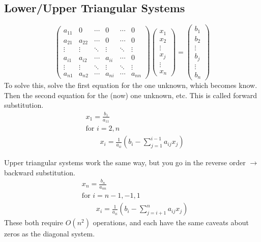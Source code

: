 \documentclass[12pt]{exam}
\begin{document}
\subsection*{Lower/Upper Triangular Systems}
\begin{equation}
   \begin{pmatrix}
      a_{11} & 0      & \cdots & 0      & \cdots & 0 \\
      a_{21} & a_{22} & \cdots & 0      & \cdots & 0 \\
      \vdots & \vdots & \ddots & \vdots & \ddots & \vdots \\     
      a_{i1} & a_{i2} & \cdots & a_{ii} & \cdots & 0 \\
      \vdots & \vdots & \ddots & \vdots & \ddots & \vdots \\
      a_{n1} & a_{n2} & \cdots & a_{ni} & \cdots & a_{nn} 
    \end{pmatrix} 
    \begin{pmatrix} x_1 \\ x_2 \\ \vdots \\ x_j \\ \vdots \\ x_n \end{pmatrix} =
    \begin{pmatrix} b_1 \\ b_2 \\ \vdots \\ b_j \\ \vdots \\ b_n \end{pmatrix}
    \nonumber   
\end{equation} 
%
To solve this, solve the first equation for the one unknown, which becomes know. Then the second equation for the (now) one unknown, etc. This is called forward substitution.
%
\ifprintanswers
\begin{align}
&x_1 = \frac{b_1}{a_{11}} \nonumber \\
&\text{for } i = 2, n \nonumber \\
&\qquad x_i = \frac{1}{a_{ii}}(b_i - \sum_{j=1}^{i-1} a_{ij} x_j) \nonumber
\end{align}
\else
\vspace*{6em}
\fi

Upper triangular systems work the same way, but you go in the reverse order $\rightarrow$ backward substitution. 
%
\begin{align}
&x_n = \frac{b_n}{a_{nn}} \nonumber \\
&\text{for } i = n-1, -1, 1 \nonumber \\
&\qquad x_i = \frac{1}{a_{ii}}(b_i - \sum_{j=i+1}^{n} a_{ij} x_j) \nonumber
\end{align}
%
\ifprintanswers
These both require $O(n^2)$ operations, and each have the same caveats about zeros as the diagonal system.
\else
\\\vspace*{1em}
\fi
\end{document}
